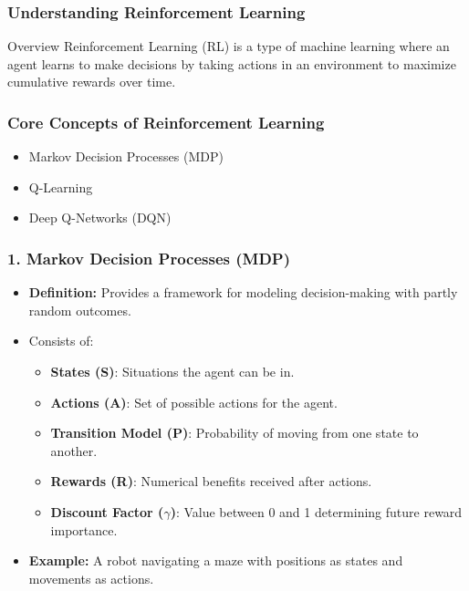 \documentclass[aspectratio=169]{beamer}
\begin{document}
\begin{frame}[fragile]
    \frametitle{Understanding Reinforcement Learning}
    \begin{block}{Overview}
        Reinforcement Learning (RL) is a type of machine learning where an agent learns to make decisions by taking actions in an environment to maximize cumulative rewards over time.
    \end{block}
\end{frame}

\begin{frame}[fragile]
    \frametitle{Core Concepts of Reinforcement Learning}
    \begin{itemize}
        \item Markov Decision Processes (MDP)
        \item Q-Learning
        \item Deep Q-Networks (DQN)
    \end{itemize}
\end{frame}

\begin{frame}[fragile]
    \frametitle{1. Markov Decision Processes (MDP)}
    \begin{itemize}
        \item \textbf{Definition:} Provides a framework for modeling decision-making with partly random outcomes.
        \item Consists of:
        \begin{itemize}
            \item \textbf{States (S)}: Situations the agent can be in.
            \item \textbf{Actions (A)}: Set of possible actions for the agent.
            \item \textbf{Transition Model (P)}: Probability of moving from one state to another.
            \item \textbf{Rewards (R)}: Numerical benefits received after actions.
            \item \textbf{Discount Factor ($\gamma$)}: Value between 0 and 1 determining future reward importance.
        \end{itemize}
        \item \textbf{Example:} A robot navigating a maze with positions as states and movements as actions.
    \end{itemize}
\end{frame}
\end{document}

